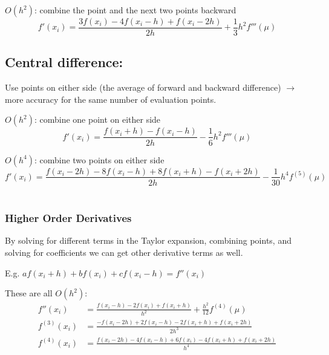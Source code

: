 \documentclass[12pt]{exam}
\begin{document}
\underline{$O(h^2)$}: combine the point and the next two points backward
%
\[f'(x_i) = \frac{3 f(x_i) - 4f(x_i - h) + f(x_i - 2h)}{2h} + \frac{1}{3}h^2 f'''(\mu)\]

\subsection*{Central difference:}
Use points on either side (the average of forward and backward difference) $\rightarrow$ more accuracy for the same number of evaluation  points.

\underline{$O(h^2)$}: combine one point on either side
\[f'(x_i) = \frac{f(x_i + h) - f(x_i - h)}{2h} - \frac{1}{6}h^2 f'''(\mu)\]

\underline{$O(h^4)$}: combine two points on either side
\ifprintanswers
\[f'(x_i) = \frac{f(x_i - 2h) - 8f(x_i - h) + 8f(x_i + h) - f(x_i + 2h)}{2h} - \frac{1}{30}h^4 f^{(5)}(\mu)\]
\else
\\\vspace*{2em}
\fi

\subsubsection*{Higher Order Derivatives}
By solving for different terms in the Taylor expansion, combining points, and solving for coefficients we can get other derivative terms as well. 

E.g. $a f(x_i + h) + b f(x_i) + c f(x_i - h) = f''(x_i)$

These are all $O(h^2)$:
\begin{align*}
f''(x_i) &= \frac{f(x_i - h) - 2f(x_i) + f(x_i + h)}{h^2} + \frac{h^2}{12}f^{(4)}(\mu) \\
%
f^{(3)}(x_i) &= \frac{-f(x_i - 2h) + 2f(x_i - h) - 2f(x_i + h) + f(x_i + 2h)}{2h^3}\\
%
f^{(4)}(x_i) &= \frac{f(x_i - 2h) - 4f(x_i - h) +6f(x_i) - 4f(x_i + h) + f(x_i + 2h)}{h^4}
\end{align*}
\end{document}
